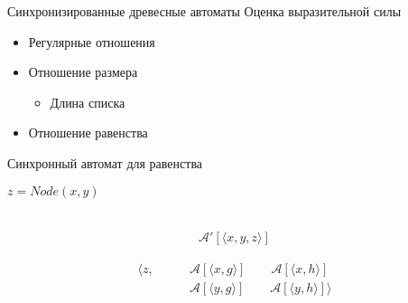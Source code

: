 \documentclass{beamer}
\newcommand{\aut}{\mathcal{A}}
\begin{document}
\begin{frame}{Синхронизированные древесные автоматы}
Оценка выразительной силы
\begin{itemize}
\item Регулярные отношения
\pause
\item Отношение размера
\begin{itemize}
    \item Длина списка
\end{itemize}
\pause
\item Отношение равенства
\end{itemize}
\end{frame}


\begin{frame}{Синхронный автомат для равенства}
\begin{minipage}{1\linewidth}
$z = Node(x, y)$\\
\\
\PattternAutomata
\end{minipage}
\pause
\begin{minipage}{0.4\linewidth}
\vspace{1em}
\begin{align*}
    \aut'[\langle x, y, z \rangle]
\end{align*}
\end{minipage}
\begin{minipage}{0.4\linewidth}
\vspace{1em}
\begin{align*}
    \langle z,
    &\qquad \aut[\langle x, g \rangle] 
    \qquad \aut[\langle x, h \rangle] \\
    &\qquad \aut[\langle y, g \rangle] 
    \qquad \aut[\langle y, h \rangle] \rangle 
\end{align*}
\end{minipage}
\end{frame}
\end{document}
